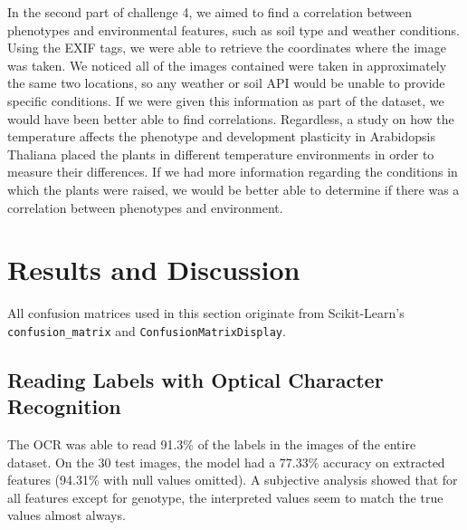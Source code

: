 \documentclass[final,5p,times,twocolumn,authoryear]{elsarticle}
\begin{document}
In the second part of challenge 4, we aimed to find a correlation between phenotypes and environmental features, such as soil type and weather conditions. Using the EXIF tags, we were able to retrieve the coordinates where the image was taken. We noticed all of the images contained were taken in approximately the same two locations, so any weather or soil API would be unable to provide specific conditions. If we were given this information as part of the dataset, we would have been better able to find correlations. Regardless, a study on how the temperature affects the phenotype and development plasticity in Arabidopsis Thaliana \citep{ibanez2017ambient} placed the plants in different temperature environments in order to measure their differences. If we had more information regarding the conditions in which the plants were raised, we would be better able to determine if there was a correlation between phenotypes and environment.


\section{Results and Discussion}
\label{results}

All confusion matrices used in this section originate from Scikit-Learn's \verb|confusion_matrix| and \verb|ConfusionMatrixDisplay|.

\subsection{Reading Labels with Optical Character Recognition}
\label{step_1}

The OCR was able to read 91.3\% of the labels in the images of the entire dataset. On the 30 test images, the model had a 77.33\% accuracy on extracted features (94.31\% with null values omitted). A subjective analysis showed that for all features except for genotype, the interpreted values seem to match the true values almost always.

\begin{center}
\label{Table1}
\end{center}
\end{document}
